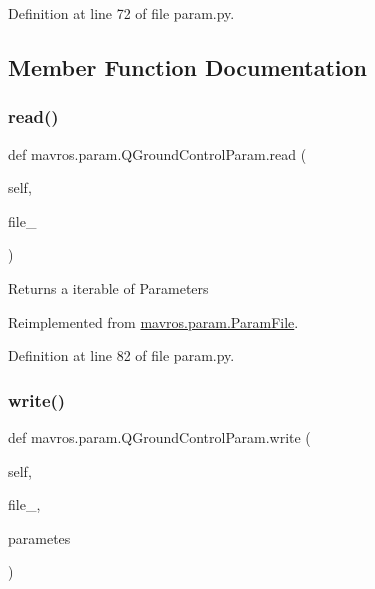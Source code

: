 Definition at line 72 of file param.\+py.



\subsection{Member Function Documentation}
\mbox{\label{classmavros_1_1param_1_1QGroundControlParam_af1e7488ab8a9b48f3eddd07307a8f74e}} 
\subsubsection{\texorpdfstring{read()}{read()}}
{\footnotesize\ttfamily def mavros.\+param.\+Q\+Ground\+Control\+Param.\+read (\begin{DoxyParamCaption}\item[{}]{self,  }\item[{}]{file\+\_\+ }\end{DoxyParamCaption})}

\begin{DoxyVerb}Returns a iterable of Parameters\end{DoxyVerb}
 

Reimplemented from \mbox{\hyperlink{classmavros_1_1param_1_1ParamFile_adb004524182c02e4bd16705c259895d2}{mavros.\+param.\+Param\+File}}.



Definition at line 82 of file param.\+py.

\mbox{\label{classmavros_1_1param_1_1QGroundControlParam_aa0d9f027320486aca9bbbe696c3fd994}} 
\subsubsection{\texorpdfstring{write()}{write()}}
{\footnotesize\ttfamily def mavros.\+param.\+Q\+Ground\+Control\+Param.\+write (\begin{DoxyParamCaption}\item[{}]{self,  }\item[{}]{file\+\_\+,  }\item[{}]{parametes }\end{DoxyParamCaption})}

